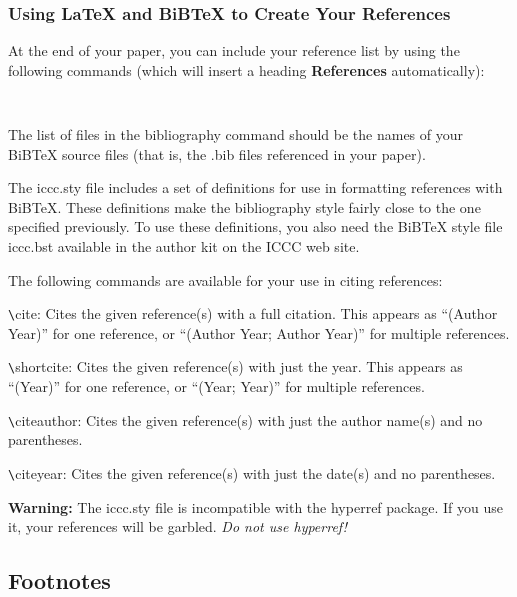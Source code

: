 \documentclass[letterpaper]{article}
\begin{document}
\subsubsection{Using \LaTeX{} and BiBTeX to Create Your References}
At the end of your paper, you can include your reference list by using the following commands (which will insert a heading \textbf{References} automatically):

\begin{footnotesize}
\begin{verbatim}


\end{verbatim}
\end{footnotesize}

The list of files in the bibliography command should be the names of your BiBTeX source files (that is, the .bib files referenced in your paper).

The iccc.sty file includes a set of definitions for use in formatting references with BiBTeX. These definitions make the bibliography style fairly close to the one specified previously. To use these definitions, you also need the BiBTeX style file iccc.bst available in the author kit on the ICCC web site.

The following commands are available for your use in citing references:
\begin{description}
\item \verb+\+cite: Cites the given reference(s) with a full citation. This appears as ``(Author Year)'' for one reference, or ``(Author Year; Author Year)'' for multiple references.
\item \verb+\+shortcite: Cites the given reference(s) with just the year. This appears as ``(Year)'' for one reference, or ``(Year; Year)'' for multiple references.
\item \verb+\+citeauthor: Cites the given reference(s) with just the author name(s) and no parentheses.
\item \verb+\+citeyear: Cites the given reference(s) with just the date(s) and no parentheses.
\end{description}

{\bf Warning:} The iccc.sty file is incompatible with the hyperref package. If you use it, your references will be garbled. {\it Do not use hyperref!}

\subsection{Footnotes}
\end{document}
